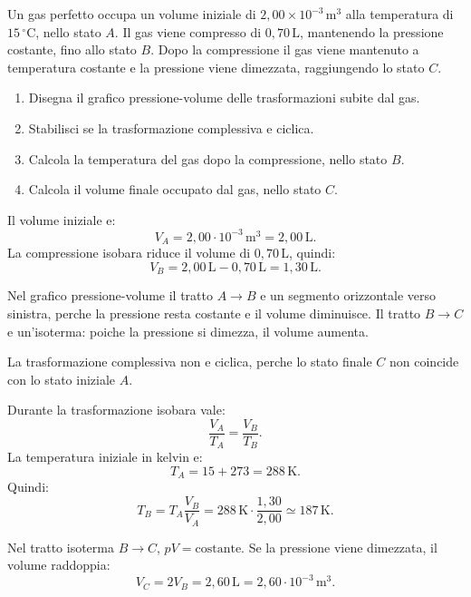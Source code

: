 
\begin{esercizio}
Un gas perfetto occupa un volume iniziale di
\(2{,}00 \times 10^{-3}\,\mathrm{m^3}\) alla temperatura di
\(15\,^\circ\mathrm{C}\), nello stato \(A\). Il gas viene compresso di
\(0{,}70\,\mathrm{L}\), mantenendo la pressione costante, fino allo stato
\(B\). Dopo la compressione il gas viene mantenuto a temperatura costante e la
pressione viene dimezzata, raggiungendo lo stato \(C\).

\begin{enumerate}
  \item Disegna il grafico pressione-volume delle trasformazioni subite dal gas.
  \item Stabilisci se la trasformazione complessiva e ciclica.
  \item Calcola la temperatura del gas dopo la compressione, nello stato \(B\).
  \item Calcola il volume finale occupato dal gas, nello stato \(C\).
\end{enumerate}
\end{esercizio}

\begin{soluzione}
Il volume iniziale e:
\[
V_A=2{,}00\cdot 10^{-3}\,\mathrm{m^3}=2{,}00\,\mathrm{L}.
\]
La compressione isobara riduce il volume di \(0{,}70\,\mathrm{L}\), quindi:
\[
V_B=2{,}00\,\mathrm{L}-0{,}70\,\mathrm{L}
=1{,}30\,\mathrm{L}.
\]

Nel grafico pressione-volume il tratto \(A\to B\) e un segmento orizzontale
verso sinistra, perche la pressione resta costante e il volume diminuisce. Il
tratto \(B\to C\) e un'isoterma: poiche la pressione si dimezza, il volume
aumenta.

La trasformazione complessiva non e ciclica, perche lo stato finale \(C\) non
coincide con lo stato iniziale \(A\).

Durante la trasformazione isobara vale:
\[
\frac{V_A}{T_A}=\frac{V_B}{T_B}.
\]
La temperatura iniziale in kelvin e:
\[
T_A=15+273=288\,\mathrm{K}.
\]
Quindi:
\[
T_B=T_A\frac{V_B}{V_A}
=288\,\mathrm{K}\cdot \frac{1{,}30}{2{,}00}
\simeq 187\,\mathrm{K}.
\]

Nel tratto isoterma \(B\to C\), \(pV=\text{costante}\). Se la pressione viene
dimezzata, il volume raddoppia:
\[
V_C=2V_B=2{,}60\,\mathrm{L}
=2{,}60\cdot 10^{-3}\,\mathrm{m^3}.
\]
\end{soluzione}
